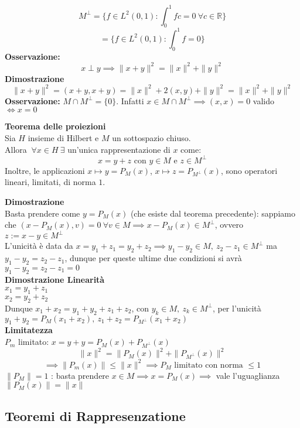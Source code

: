\documentclass[a4paper]{article}
\newcommand{\R}{\mathbb{R}}
\begin{document}
\[M^{\perp}=\{f\in L^{2}(0,1): \int_{0}^{1} fc=0\ \forall c\in \R \} \]
\[=\{f\in L^{2}(0,1): \int_{0}^{1} f=0 \} \]
\textbf{Osservazione:} 
\[x\perp y\implies \|x+y\|^2=\|x\|^2+\|y\|^2\]
\textbf{Dimostrazione}
\[\|x+y\|^2=(x+y,x+y)=\|x\|^2+2(x,y)+\|y\|^2=\|x\|^2+\|y\|^2\]
\textbf{Osservazione: }$M\cap M^\perp=\{0\} $. Infatti $x\in M\cap M^\perp\implies (x,x)=0$ valido $\iff x=0$
\begin{tcolorbox}
\textbf{Teorema delle proiezioni}
\\Sia $H$ insieme di Hilbert e $M$ un sottospazio chiuso.
\\Allora $\ \forall x\in H\ \exists $ un'unica rappresentazione di $x$ come:
\[x=y+z\text{ con }y\in M\text{ e }z\in M^\perp\]
Inoltre, le applicazioni $x\mapsto y=P_M(x)$, $x\mapsto z=P_{M^\perp}(x)$, sono operatori lineari, limitati, di norma $1$.
\end{tcolorbox}
\textbf{Dimostrazione} 
\\Basta prendere come $y=P_M(x)$ (che esiste dal teorema precedente): sappiamo che $(x-P_M(x),v)=0\ \forall v\in M\implies x-P_M(x)\in M^\perp$, ovvero $z:=x-y\in M^\perp$
\\L'unicità è data da $x=y_1+z_1=y_2+z_2\implies y_1-y_2 \in M, \ z_2-z_1\in M^\perp$ ma $y_1-y_2=z_2-z_1$, dunque per queste ultime due condizioni si avrà $y_1-y_2=z_2-z_1=0$
\\\textbf{Dimostrazione Linearità} 
\\$x_1=y_1+z_1$ 
\\$x_2=y_2+z_2$
\\Dunque $x_1+x_2=y_1+y_2+z_1+z_2$, con $y_k\in M,\ z_k\in M^\perp$, per l'unicità $y_1+y_2=P_M(x_1+x_2),\ z_1+z_2=P_{M^\perp}(x_1+x_2)$
\\\textbf{Limitatezza}\\
$P_m$ limitato: $x=y+y=P_M(x)+P_{M^\perp}(x)$
\[\|x\|^2=\|P_M(x)\|^2+\|P_{M^\perp}(x)\|^2\]\[\implies \|P_m(x)\|\le \|x\|^2\implies P_M\text{ limitato con norma }\le 1\]
$\|P_M\|=1$ : basta prendere $x\in M\implies x=P_M(x)\implies $ vale l'uguaglianza $\|P_M(x)\|=\|x\|$
\subsection{Teoremi di Rappresenzatione}
\end{document}
